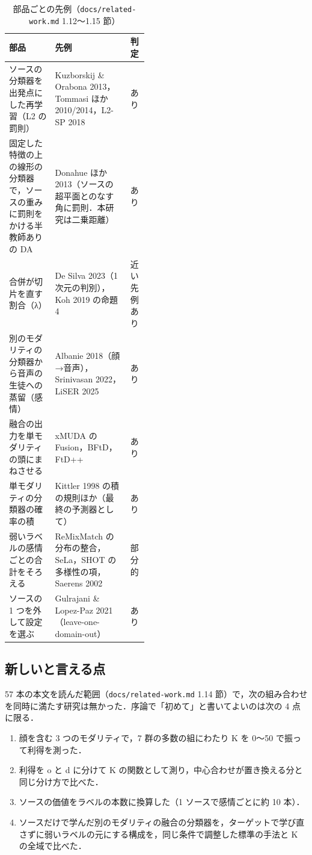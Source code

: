\documentclass[a4paper,11pt]{ltjsarticle}
\begin{document}
\begin{table}[h]
\centering\small
\caption{部品ごとの先例（\texttt{docs/related-work.md} 1.12〜1.15 節）}
\begin{tabularx}{\linewidth}{@{}p{0.33\linewidth}Lp{0.13\linewidth}@{}}
\toprule
部品 & 先例 & 判定 \\
\midrule
ソースの分類器を出発点にした再学習（L2 の罰則） & Kuzborskij \& Orabona 2013，Tommasi ほか 2010/2014，L2-SP 2018 & あり \\
固定した特徴の上の線形の分類器で，ソースの重みに罰則をかける半教師ありの DA & Donahue ほか 2013（ソースの超平面とのなす角に罰則．本研究は二乗距離） & あり \\
合併が切片を直す割合（λ） & De Silva 2023（1 次元の判別），Koh 2019 の命題 4 & 近い先例あり \\
別のモダリティの分類器から音声の生徒への蒸留（感情） & Albanie 2018（顔→音声），Srinivasan 2022，LiSER 2025 & あり \\
融合の出力を単モダリティの頭にまねさせる & xMUDA の Fusion，BFtD，FtD++ & あり \\
単モダリティの分類器の確率の積 & Kittler 1998 の積の規則ほか（最終の予測器として） & あり \\
弱いラベルの感情ごとの合計をそろえる & ReMixMatch の分布の整合，SeLa，SHOT の多様性の項，Saerens 2002 & 部分的 \\
ソースの 1 つを外して設定を選ぶ & Gulrajani \& Lopez-Paz 2021（leave-one-domain-out） & あり \\
\bottomrule
\end{tabularx}
\end{table}

\subsection{新しいと言える点}

57 本の本文を読んだ範囲（\texttt{docs/related-work.md} 1.14 節）で，次の組み合わせを同時に満たす研究は無かった．序論で「初めて」と書いてよいのは次の 4 点に限る．

\begin{enumerate}
\item 顔を含む 3 つのモダリティで，7 群の多数の組にわたり K を 0〜50 で振って利得を測った．
\item 利得を o と d に分けて K の関数として測り，中心合わせが置き換える分と同じ分け方で比べた．
\item ソースの価値をラベルの本数に換算した（1 ソースで感情ごとに約 10 本）．
\item ソースだけで学んだ別のモダリティの融合の分類器を，ターゲットで学び直さずに弱いラベルの元にする構成を，同じ条件で調整した標準の手法と K の全域で比べた．
\end{enumerate}
\end{document}
